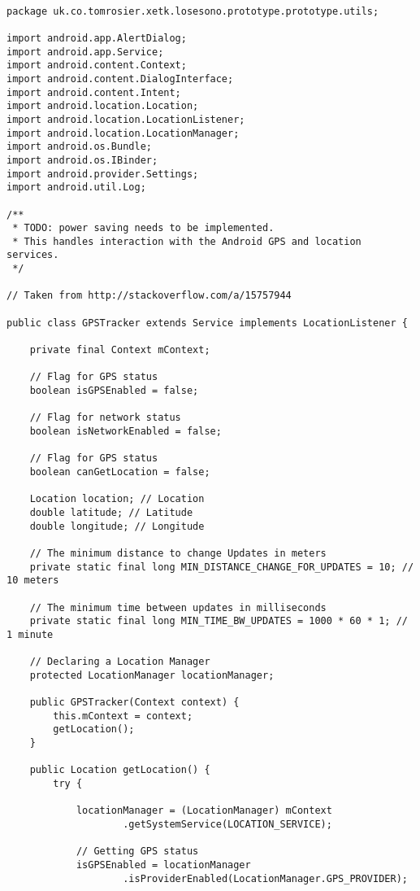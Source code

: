 \begin{lstlisting}

package uk.co.tomrosier.xetk.losesono.prototype.prototype.utils;

import android.app.AlertDialog;
import android.app.Service;
import android.content.Context;
import android.content.DialogInterface;
import android.content.Intent;
import android.location.Location;
import android.location.LocationListener;
import android.location.LocationManager;
import android.os.Bundle;
import android.os.IBinder;
import android.provider.Settings;
import android.util.Log;

/**
 * TODO: power saving needs to be implemented.
 * This handles interaction with the Android GPS and location services.
 */

// Taken from http://stackoverflow.com/a/15757944

public class GPSTracker extends Service implements LocationListener {

    private final Context mContext;

    // Flag for GPS status
    boolean isGPSEnabled = false;

    // Flag for network status
    boolean isNetworkEnabled = false;

    // Flag for GPS status
    boolean canGetLocation = false;

    Location location; // Location
    double latitude; // Latitude
    double longitude; // Longitude

    // The minimum distance to change Updates in meters
    private static final long MIN_DISTANCE_CHANGE_FOR_UPDATES = 10; // 10 meters

    // The minimum time between updates in milliseconds
    private static final long MIN_TIME_BW_UPDATES = 1000 * 60 * 1; // 1 minute

    // Declaring a Location Manager
    protected LocationManager locationManager;

    public GPSTracker(Context context) {
        this.mContext = context;
        getLocation();
    }

    public Location getLocation() {
        try {

            locationManager = (LocationManager) mContext
                    .getSystemService(LOCATION_SERVICE);

            // Getting GPS status
            isGPSEnabled = locationManager
                    .isProviderEnabled(LocationManager.GPS_PROVIDER);


\end{lstlisting}
